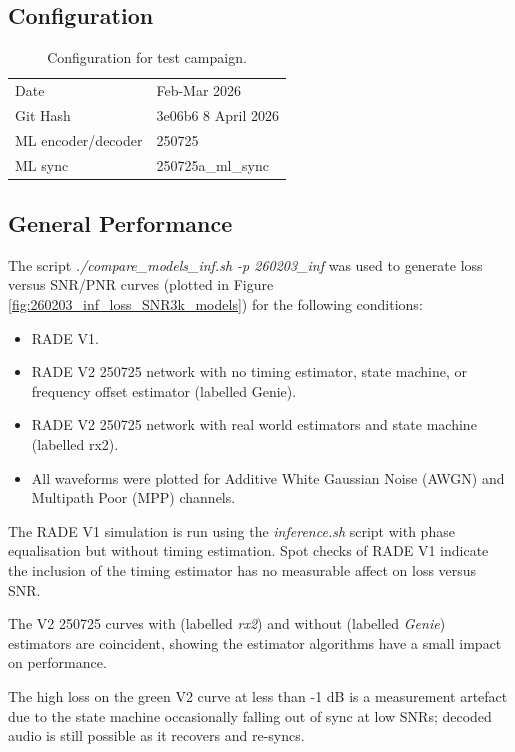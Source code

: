 \documentclass{article}
\begin{document}
\subsection{Configuration}

\begin{table} [h]
\caption{Configuration for test campaign.}
\label{tab:time_to_acq}
\centering
\begin{tabular}{ l | l }
 \hline
  Date  & Feb-Mar 2026 \\
  Git Hash & 3e06b6 8 April 2026 \\
  ML encoder/decoder & 250725 \\
  ML sync & 250725a\_ml\_sync \\
 \hline
\end{tabular}
\end{table}

\subsection{General Performance}

The script \emph{./compare\_models\_inf.sh -p 260203\_inf} was used to generate loss versus SNR/PNR curves (plotted in Figure \ref{fig:260203_inf_loss_SNR3k_models}) for the following conditions:
\begin{itemize}
\item RADE V1.
\item RADE V2 250725 network with no timing estimator, state machine, or frequency offset estimator (labelled Genie).
\item RADE V2 250725 network with real world estimators and state machine (labelled rx2).
\item All waveforms were plotted for Additive White Gaussian Noise (AWGN) and Multipath Poor (MPP) channels.
\end{itemize}

The RADE V1 simulation is run using the \emph{inference.sh} script with phase equalisation but without timing estimation.  Spot checks of RADE V1 indicate the inclusion of the timing estimator has no measurable affect on loss versus SNR.

The V2 250725 curves with (labelled \emph{rx2}) and without (labelled \emph{Genie}) estimators are coincident, showing the estimator algorithms have a small impact on performance.

The high loss on the green V2 curve at less than -1 \si{dB} is a measurement artefact due to the state machine occasionally falling out of sync at low SNRs; decoded audio is still possible as it recovers and re-syncs.
\end{document}
